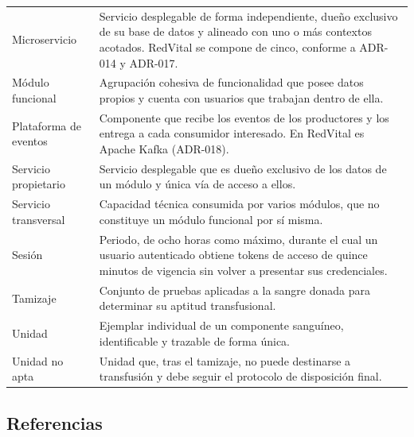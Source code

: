 \documentclass[11pt,a4paper]{article}
\begin{document}
\begin{longtable}{L{3.6cm} L{11.0cm}}
Microservicio & Servicio desplegable de forma independiente, dueño exclusivo de su base de datos y alineado con uno o más contextos acotados. RedVital se compone de cinco, conforme a ADR-014 y ADR-017. \\
Módulo funcional & Agrupación cohesiva de funcionalidad que posee datos propios y cuenta con usuarios que trabajan dentro de ella. \\
Plataforma de eventos & Componente que recibe los eventos de los productores y los entrega a cada consumidor interesado. En RedVital es Apache Kafka (ADR-018). \\
Servicio propietario & Servicio desplegable que es dueño exclusivo de los datos de un módulo y única vía de acceso a ellos. \\
Servicio transversal & Capacidad técnica consumida por varios módulos, que no constituye un módulo funcional por sí misma. \\
Sesión & Periodo, de ocho horas como máximo, durante el cual un usuario autenticado obtiene tokens de acceso de quince minutos de vigencia sin volver a presentar sus credenciales. \\
Tamizaje & Conjunto de pruebas aplicadas a la sangre donada para determinar su aptitud transfusional. \\
Unidad & Ejemplar individual de un componente sanguíneo, identificable y trazable de forma única. \\
Unidad no apta & Unidad que, tras el tamizaje, no puede destinarse a transfusión y debe seguir el protocolo de disposición final. \\
\end{longtable}

\subsection{Referencias}
\end{document}
